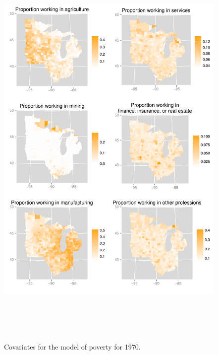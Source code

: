\documentclass[authoryear, review, 11pt]{elsarticle}
\begin{document}
	\begin{figure}
		\begin{center}
			\includegraphics[height=8in]{../../figures/poverty/1970-covariates}
			\caption{Covariates for the model of poverty for 1970. \label{fig:1970-covariates}}
		\end{center}
	\end{figure}
\end{document}
